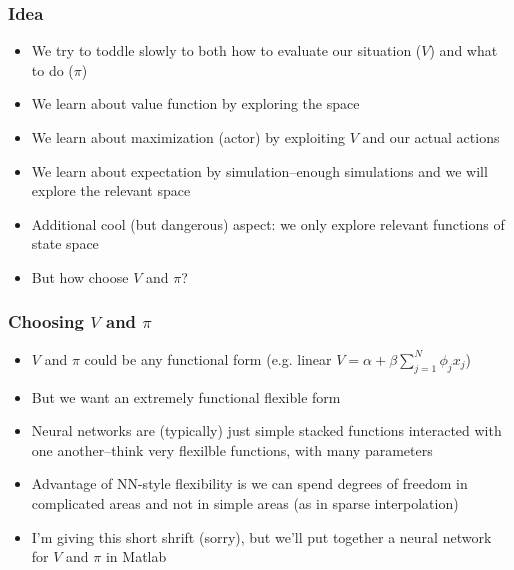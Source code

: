 \documentclass{beamer}
\begin{document}
\begin{frame}
\frametitle[alignment=center]{Idea}
\begin{itemize}
\item We try to toddle slowly to both how to evaluate our situation ($V$) and what to do ($\pi$)
\bigskip
\item We learn about value function by exploring the space
\bigskip
\item We learn about maximization (actor) by exploiting $V$ and our actual actions
\bigskip
\item We learn about expectation by simulation--enough simulations and we will explore the relevant space
\bigskip
\item Additional cool (but dangerous) aspect: we only explore relevant functions of state space
\bigskip
\item But how choose $V$ and $\pi$?
\end{itemize}
\end{frame}

\begin{frame}
\frametitle[alignment=center]{Choosing $V$ and $\pi$}
\begin{itemize}
\item $V$ and $\pi$ could be any functional form (e.g. linear $V=\alpha+\beta\sum_{j=1}^N\phi_jx_{j}$)
\bigskip
\item But we want an extremely functional flexible form
\bigskip
\item Neural networks are (typically) just simple stacked functions interacted with one another--think very flexilble functions, with many parameters
\bigskip
\item Advantage of NN-style flexibility is we can spend degrees of freedom in complicated areas and not in simple areas (as in sparse interpolation)
\bigskip
\item I'm giving this short shrift (sorry), but we'll put together a neural network for $V$ and $\pi$ in Matlab
\end{itemize}
\end{frame}
\end{document}
